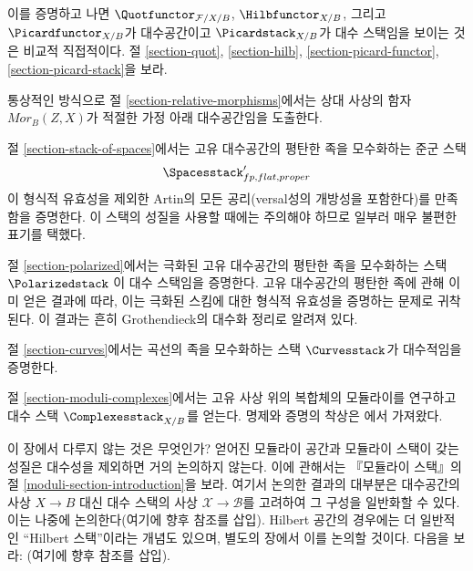 \medskip\noindent
이를 증명하고 나면
$\Quotfunctor_{\mathcal{F}/X/B}$, $\Hilbfunctor_{X/B}$, 그리고
$\Picardfunctor_{X/B}$가 대수공간이고
$\Picardstack_{X/B}$가 대수 스택임을 보이는 것은 비교적 직접적이다.
절 \ref{section-quot}, \ref{section-hilb},
\ref{section-picard-functor}, \ref{section-picard-stack}을 보라.

\medskip\noindent
통상적인 방식으로 절 \ref{section-relative-morphisms}에서는
상대 사상의 함자 $\mathit{Mor}_B(Z, X)$가 적절한 가정 아래
대수공간임을 도출한다.

\medskip\noindent
절 \ref{section-stack-of-spaces}에서는 고유 대수공간의 평탄한 족을
모수화하는 준군 스택
$$
\Spacesstack'_{fp, flat, proper}
$$
이 형식적 유효성을 제외한 Artin의 모든 공리(versal성의 개방성을
포함한다)를 만족함을 증명한다. 이 스택의 성질을 사용할 때에는
주의해야 하므로 일부러 매우 불편한 표기를 택했다.

\medskip\noindent
절 \ref{section-polarized}에서는 극화된 고유 대수공간의 평탄한 족을
모수화하는 스택
$\Polarizedstack$
이 대수 스택임을 증명한다. 고유 대수공간의 평탄한 족에 관해 이미
얻은 결과에 따라, 이는 극화된 스킴에 대한 형식적 유효성을 증명하는
문제로 귀착된다. 이 결과는 흔히 Grothendieck의 대수화 정리로 알려져 있다.

\medskip\noindent
절 \ref{section-curves}에서는 곡선의 족을 모수화하는 스택
$\Curvesstack$가 대수적임을 증명한다.

\medskip\noindent
절 \ref{section-moduli-complexes}에서는 고유 사상 위의 복합체의
모듈라이를 연구하고 대수 스택 $\Complexesstack_{X/B}$를 얻는다.
명제와 증명의 착상은 \cite{lieblich-complexes}에서 가져왔다.

\medskip\noindent
이 장에서 다루지 않는 것은 무엇인가? 얻어진 모듈라이 공간과 모듈라이
스택이 갖는 성질은 대수성을 제외하면 거의 논의하지 않는다.
이에 관해서는 『모듈라이 스택』의 절
\ref{moduli-section-introduction}을 보라. 여기서 논의한 결과의 대부분은
대수공간의 사상 $X \to B$ 대신 대수 스택의 사상
$\mathcal{X} \to \mathcal{B}$를 고려하여 그 구성을 일반화할 수 있다.
이는 나중에 논의한다(여기에 향후 참조를 삽입).
Hilbert 공간의 경우에는 더 일반적인 ``Hilbert 스택''이라는 개념도 있으며,
별도의 장에서 이를 논의할 것이다. 다음을 보라:
(여기에 향후 참조를 삽입).




